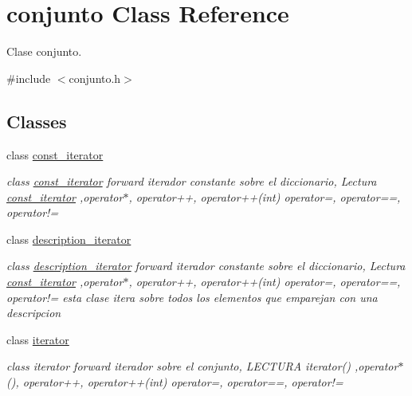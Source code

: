 \hypertarget{classconjunto}{\section{conjunto Class Reference}
\label{classconjunto}
}


Clase conjunto.  




{\ttfamily \#include $<$conjunto.\-h$>$}

\subsection*{Classes}
\begin{DoxyCompactItemize}
\item 
class \hyperlink{classconjunto_1_1const__iterator}{const\-\_\-iterator}
\begin{DoxyCompactList}\small\item\em class \hyperlink{classconjunto_1_1const__iterator}{const\-\_\-iterator} forward iterador constante sobre el diccionario, Lectura \hyperlink{classconjunto_1_1const__iterator}{const\-\_\-iterator} ,operator$\ast$, operator++, operator++(int) operator=, operator==, operator!= \end{DoxyCompactList}\item 
class \hyperlink{classconjunto_1_1description__iterator}{description\-\_\-iterator}
\begin{DoxyCompactList}\small\item\em class \hyperlink{classconjunto_1_1description__iterator}{description\-\_\-iterator} forward iterador constante sobre el diccionario, Lectura \hyperlink{classconjunto_1_1const__iterator}{const\-\_\-iterator} ,operator$\ast$, operator++, operator++(int) operator=, operator==, operator!= esta clase itera sobre todos los elementos que emparejan con una descripcion \end{DoxyCompactList}\item 
class \hyperlink{classconjunto_1_1iterator}{iterator}
\begin{DoxyCompactList}\small\item\em class iterator forward iterador sobre el conjunto, L\-E\-C\-T\-U\-R\-A iterator() ,operator$\ast$(), operator++, operator++(int) operator=, operator==, operator!= \end{DoxyCompactList}\end{DoxyCompactItemize}
